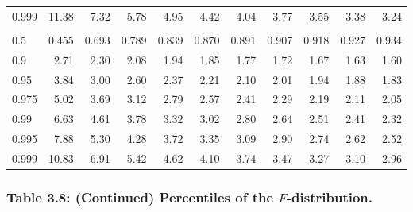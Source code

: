 \documentclass[]{article}
\begin{document}
\begin{table}[H]
\begin{tabular}{lrrrrrrrrrr}
\hspace{1em}0.999 & 11.38 & 7.32 & 5.78 & 4.95 & 4.42 & 4.04 & 3.77 & 3.55 & 3.38 & 3.24\\
\addlinespace[0.3em]
\multicolumn{11}{l}{\textbf{$k_2=\infty$}}\\
\hspace{1em}0.5 & 0.455 & 0.693 & 0.789 & 0.839 & 0.870 & 0.891 & 0.907 & 0.918 & 0.927 & 0.934\\
\hspace{1em}0.9 & 2.71 & 2.30 & 2.08 & 1.94 & 1.85 & 1.77 & 1.72 & 1.67 & 1.63 & 1.60\\
\hspace{1em}0.95 & 3.84 & 3.00 & 2.60 & 2.37 & 2.21 & 2.10 & 2.01 & 1.94 & 1.88 & 1.83\\
\hspace{1em}0.975 & 5.02 & 3.69 & 3.12 & 2.79 & 2.57 & 2.41 & 2.29 & 2.19 & 2.11 & 2.05\\
\hspace{1em}0.99 & 6.63 & 4.61 & 3.78 & 3.32 & 3.02 & 2.80 & 2.64 & 2.51 & 2.41 & 2.32\\
\hspace{1em}0.995 & 7.88 & 5.30 & 4.28 & 3.72 & 3.35 & 3.09 & 2.90 & 2.74 & 2.62 & 2.52\\
\hspace{1em}0.999 & 10.83 & 6.91 & 5.42 & 4.62 & 4.10 & 3.74 & 3.47 & 3.27 & 3.10 & 2.96\\
\bottomrule
\end{tabular}
\end{table}

\hypertarget{table-3.8-continued-percentiles-of-the-f-distribution.}{%
\subsubsection{\texorpdfstring{Table 3.8: (Continued) Percentiles of the
\(F\)-distribution.}{Table 3.8: (Continued) Percentiles of the F-distribution.}}\label{table-3.8-continued-percentiles-of-the-f-distribution.}}
\end{document}
